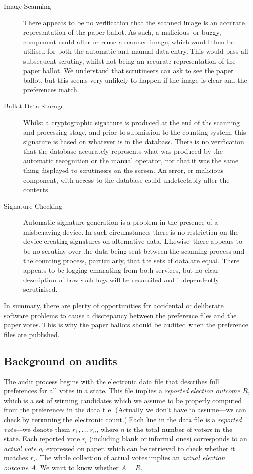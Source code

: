 \documentclass[10pt,a4paper]{article}
\newcommand{\VTNote}[1]{}
\begin{document}
\begin{description}
	\item[Image Scanning] There appears to be no verification that the scanned image is an accurate representation of the paper ballot. As such, a malicious, or buggy, component could alter or reuse a scanned image, which would then be utilised for both the automatic and manual data entry. This would pass all subsequent scrutiny, whilst not being an accurate representation of the paper ballot.  We understand that scrutineers can ask to see the paper ballot, but this seems very unlikely to happen if the image is clear and the preferences match.
	\item[Ballot Data Storage] Whilst a cryptographic signature is produced at the end of the scanning and processing stage, and prior to submission to the counting system, this signature is based on whatever is in the database. There is no verification that the database accurately represents what was produced by the automatic recognition or the manual operator, nor that it was the same thing displayed to scrutineers on the screen. An error, or malicious component, with access to the database could undetectably alter the contents. 
	\item[Signature Checking] Automatic signature generation is a problem in the presence of a misbehaving device. In such circumstances there is no restriction on the device creating signatures on alternative data. Likewise, there appears to be no scrutiny over the data being sent between the scanning process and the counting process, particularly, that the sets of data are equal. There appears to be logging emanating from both services, but no clear description of how such logs will be reconciled and independently scrutinised. 
\end{description}

In summary, there are plenty of opportunities for accidental or deliberate software problems to cause a discrepancy between the preference files and the paper votes.  This is why the paper ballots should be audited when the preference files are published.

\subsection{Background on audits}
The audit process begins with the electronic data file that describes full preferences for all votes in a state.  This file implies a \emph{reported election outcome} $R$, which is a set of winning candidates which we assume to be properly computed from the preferences in the data file.  (Actually we don't have to assume---we can check by rerunning the electronic count.)  Each line in the data file is a \emph{reported vote}---we denote them $r_1,\ldots,r_n$, where $n$ is the total number of voters in the state.  Each reported vote $r_i$ (including blank or informal ones) corresponds to an \emph{actual vote} $a_i$ expressed on paper, which can be retrieved to check whether it matches $r_i$\VTNote{\footnote{What about omissions?}}.   The whole collection of actual votes implies an \emph{actual election outcome} $A$.  We want to know whether $A = R$.
\end{document}
